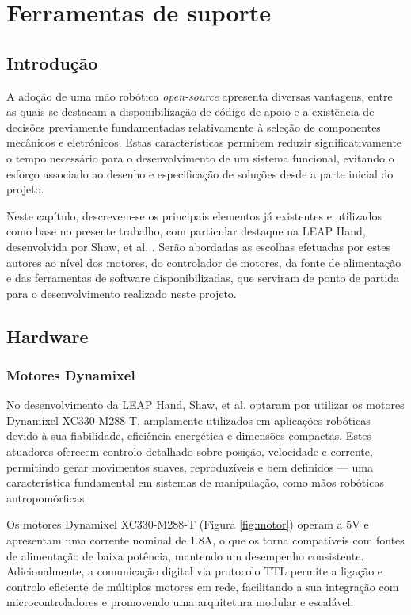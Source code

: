 \chapter{Ferramentas de suporte}
\label{chapter:suporte}

\section{Introdução}

A adoção de uma mão robótica \textit{open-source} apresenta diversas vantagens, entre as quais se destacam a disponibilização de código de apoio e a existência de decisões previamente fundamentadas relativamente à seleção de componentes mecânicos e eletrónicos. Estas características permitem reduzir significativamente o tempo necessário para o desenvolvimento de um sistema funcional, evitando o esforço associado ao desenho e especificação de soluções desde a parte inicial do projeto. 

Neste capítulo, descrevem-se os principais elementos já existentes e utilizados como base no presente trabalho, com particular destaque na LEAP Hand, desenvolvida por Shaw, et al. \cite{shaw2023leaphand}. Serão abordadas as escolhas efetuadas por estes autores ao nível dos motores, do controlador de motores, da fonte de alimentação e das ferramentas de software disponibilizadas, que serviram de ponto de partida para o desenvolvimento realizado neste projeto.

\section{Hardware}

\subsection{Motores Dynamixel}

No desenvolvimento da LEAP Hand, Shaw, et al. \cite{shaw2023leaphand} optaram por utilizar os motores Dynamixel XC330-M288-T, amplamente utilizados em aplicações robóticas devido à sua fiabilidade, eficiência energética e dimensões compactas. Estes atuadores oferecem controlo detalhado sobre posição, velocidade e corrente, permitindo gerar movimentos suaves, reproduzíveis e bem definidos — uma característica fundamental em sistemas de manipulação, como mãos robóticas antropomórficas. 

Os motores Dynamixel XC330-M288-T (Figura \ref{fig:motor}) operam a 5V e apresentam uma corrente nominal de 1.8A, o que os torna compatíveis com fontes de alimentação de baixa potência, mantendo um desempenho consistente. Adicionalmente, a comunicação digital via protocolo TTL permite a ligação e controlo eficiente de múltiplos motores em rede, facilitando a sua integração com microcontroladores e promovendo uma arquitetura modular e escalável.

